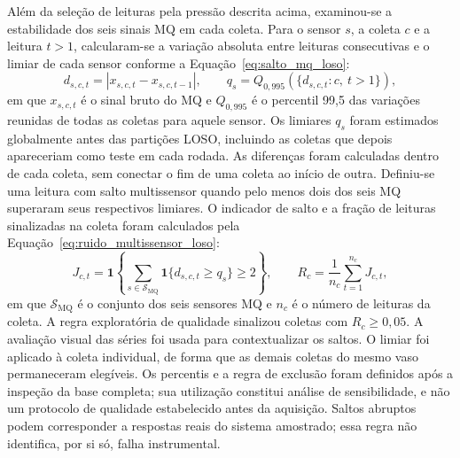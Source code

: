 Além da seleção de leituras pela pressão descrita acima, examinou-se a estabilidade dos
seis sinais MQ em cada coleta. Para o sensor $s$, a coleta $c$ e a leitura
$t>1$, calcularam-se a variação absoluta entre leituras consecutivas e o
limiar de cada sensor conforme a Equação~\eqref{eq:salto_mq_loso}:
\begin{equation}
    d_{s,c,t}=\left|x_{s,c,t}-x_{s,c,t-1}\right|,
    \qquad
    q_s=Q_{0{,}995}\!\left(\{d_{s,c,t}:c,\ t>1\}\right),
    \label{eq:salto_mq_loso}
\end{equation}
em que $x_{s,c,t}$ é o sinal bruto do MQ e $Q_{0{,}995}$ é o percentil
99,5 das variações reunidas de todas as coletas para aquele sensor.
Os limiares $q_s$ foram estimados globalmente antes das partições LOSO,
incluindo as coletas que depois apareceriam como teste em cada rodada.
As diferenças foram calculadas dentro de cada coleta, sem conectar o fim
de uma coleta ao início de outra. Definiu-se uma leitura com salto
multissensor quando pelo menos dois dos seis MQ superaram seus respectivos
limiares. O indicador de salto e a fração de leituras sinalizadas na coleta
foram calculados pela Equação~\eqref{eq:ruido_multissensor_loso}:
\begin{equation}
    J_{c,t}=\mathbf{1}\!\left\{
      \sum_{s\in\mathcal{S}_{\mathrm{MQ}}}
      \mathbf{1}\{d_{s,c,t}\geq q_s\}\geq 2
    \right\},
    \qquad
    R_c=\frac{1}{n_c}\sum_{t=1}^{n_c}J_{c,t},
    \label{eq:ruido_multissensor_loso}
\end{equation}
em que $\mathcal{S}_{\mathrm{MQ}}$ é o conjunto dos seis sensores MQ e
$n_c$ é o número de leituras da coleta. A regra exploratória de
qualidade sinalizou coletas com $R_c\geq 0{,}05$. A avaliação visual das
séries foi usada para contextualizar os saltos. O limiar foi aplicado à
coleta individual, de forma que as demais coletas do mesmo vaso permaneceram
elegíveis. Os percentis e a regra de exclusão foram definidos após a
inspeção da base completa; sua utilização constitui análise de
sensibilidade, e não um protocolo de qualidade estabelecido antes da
aquisição.
Saltos abruptos podem corresponder a respostas reais do sistema amostrado;
essa regra não identifica, por si só, falha instrumental.

